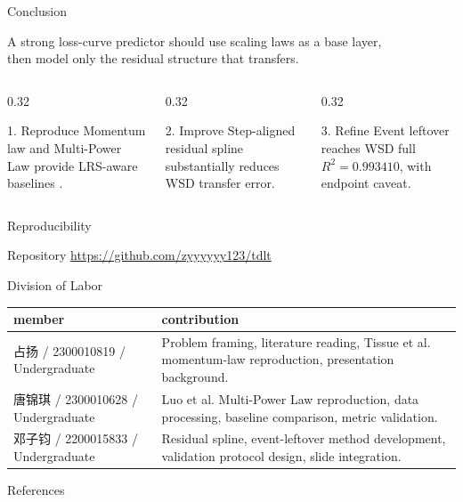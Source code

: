 \documentclass[fontset=fandol,aspectratio=169,10pt]{ctexbeamer}
\newcommand{\MemberA}{占扬 / 2300010819 / Undergraduate}
\newcommand{\MemberB}{唐锦琪 / 2300010628 / Undergraduate}
\newcommand{\MemberC}{邓子钧 / 2200015833 / Undergraduate}
\newcommand{\RepoURL}{\url{https://github.com/zyyyyyy123/tdlt}}
\begin{document}
\begin{frame}{Conclusion}
  \begin{center}
    \Large
    A strong loss-curve predictor should use scaling laws as a base layer,\\
    then model only the residual structure that transfers.
  \end{center}
  \vspace{0.9em}
  \begin{columns}[T,onlytextwidth]
    \begin{column}{0.32\textwidth}
      \begin{block}{1. Reproduce}
        Momentum law and Multi-Power Law provide LRS-aware baselines
        \cite{luo2025multi,tissue2026scaling}.
      \end{block}
    \end{column}
    \begin{column}{0.32\textwidth}
      \begin{block}{2. Improve}
        Step-aligned residual spline substantially reduces WSD transfer error.
      \end{block}
    \end{column}
    \begin{column}{0.32\textwidth}
      \begin{block}{3. Refine}
        Event leftover reaches WSD full \(R^2=0.993410\), with endpoint caveat.
      \end{block}
    \end{column}
  \end{columns}
\end{frame}

\begin{frame}{Reproducibility}
  \begin{block}{Repository}
    \RepoURL
  \end{block}
\end{frame}

\begin{frame}{Division of Labor}
  \begin{table}
    \centering
    \scriptsize
    \begin{tabularx}{0.96\textwidth}{lX}
      \toprule
      member & contribution\\
      \midrule
      \MemberA & Problem framing, literature reading, Tissue et al. momentum-law reproduction, presentation background.\\
      \MemberB & Luo et al. Multi-Power Law reproduction, data processing, baseline comparison, metric validation.\\
      \MemberC & Residual spline, event-leftover method development, validation protocol design, slide integration.\\
      \bottomrule
    \end{tabularx}
  \end{table}
\end{frame}

\begin{frame}[allowframebreaks]{References}
  \tiny
  
  
\end{frame}
\end{document}
